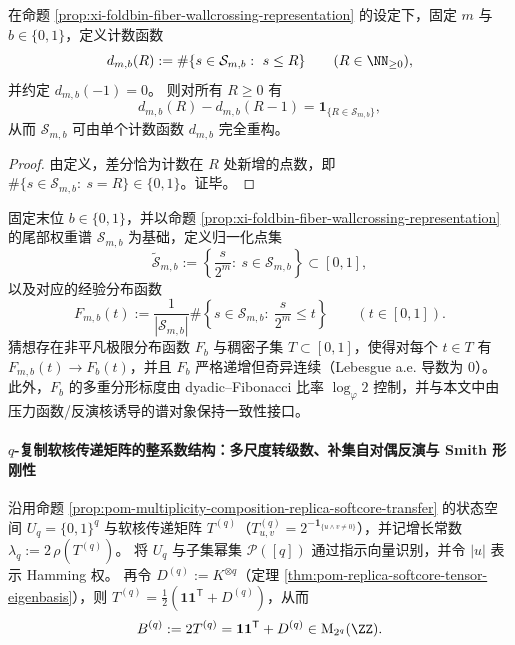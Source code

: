 \begin{corollary}[离散差分恢复尾部权重谱]\label{cor:xi-foldbin-tail-spectrum-discrete-difference}
在命题 \ref{prop:xi-foldbin-fiber-wallcrossing-representation} 的设定下，固定 \(m\) 与 \(b\in\{0,1\}\)，定义计数函数
\[
d_{m,b}(R):=\#\{s\in\mathcal{S}_{m,b}:\ s\le R\}\qquad(R\in\NN_{\ge 0}),
\]
并约定 \(d_{m,b}(-1)=0\)。
则对所有 \(R\ge 0\) 有
\[
d_{m,b}(R)-d_{m,b}(R-1)=\mathbf{1}_{\{R\in\mathcal{S}_{m,b}\}},
\]
从而 \(\mathcal{S}_{m,b}\) 可由单个计数函数 \(d_{m,b}\) 完全重构。
\end{corollary}
\begin{proof}
由定义，差分恰为计数在 \(R\) 处新增的点数，即 \(\#\{s\in\mathcal{S}_{m,b}:\ s=R\}\in\{0,1\}\)。证毕。
\end{proof}

\begin{conjecture}\label{conj:xi-foldbin-tail-spectrum-singular-limit}
固定末位 \(b\in\{0,1\}\)，并以命题 \ref{prop:xi-foldbin-fiber-wallcrossing-representation} 的尾部权重谱 \(\mathcal{S}_{m,b}\) 为基础，定义归一化点集
\[
\widetilde{\mathcal{S}}_{m,b}:=\left\{\frac{s}{2^m}:\ s\in\mathcal{S}_{m,b}\right\}\subset[0,1],
\]
以及对应的经验分布函数
\[
F_{m,b}(t):=\frac{1}{|\mathcal{S}_{m,b}|}\#\left\{s\in\mathcal{S}_{m,b}:\ \frac{s}{2^m}\le t\right\}\qquad(t\in[0,1]).
\]
猜想存在非平凡极限分布函数 \(F_b\) 与稠密子集 \(T\subset[0,1]\)，使得对每个 \(t\in T\) 有 \(F_{m,b}(t)\to F_b(t)\)，并且 \(F_b\) 严格递增但奇异连续（Lebesgue a.e. 导数为 \(0\)）。
此外，\(F_b\) 的多重分形标度由 dyadic--Fibonacci 比率 \(\log_\varphi 2\) 控制，并与本文中由压力函数/反演核诱导的谱对象保持一致性接口。
\end{conjecture}

\paragraph{\texorpdfstring{$q$}{q}-复制软核传递矩阵的整系数结构：多尺度转级数、补集自对偶反演与 Smith 形刚性}
沿用命题 \ref{prop:pom-multiplicity-composition-replica-softcore-transfer} 的状态空间 \(U_q=\{0,1\}^q\) 与软核传递矩阵 \(T^{(q)}\)（\(T^{(q)}_{u,v}=2^{-\mathbf{1}_{\{u\wedge v\neq 0\}}}\)），并记增长常数
\(
\lambda_q:=2\,\rho(T^{(q)})
\)。
将 \(U_q\) 与子集幂集 \(\mathcal P([q])\) 通过指示向量识别，并令 \(|u|\) 表示 Hamming 权。
再令 \(D^{(q)}:=K^{\otimes q}\)（定理 \ref{thm:pom-replica-softcore-tensor-eigenbasis}），则
\(
T^{(q)}=\frac12(\mathbf{1}\mathbf{1}^{\mathsf T}+D^{(q)})
\)，从而
\[
B^{(q)}:=2T^{(q)}=\mathbf{1}\mathbf{1}^{\mathsf T}+D^{(q)}\in \mathrm{M}_{2^q}(\ZZ).
\]

